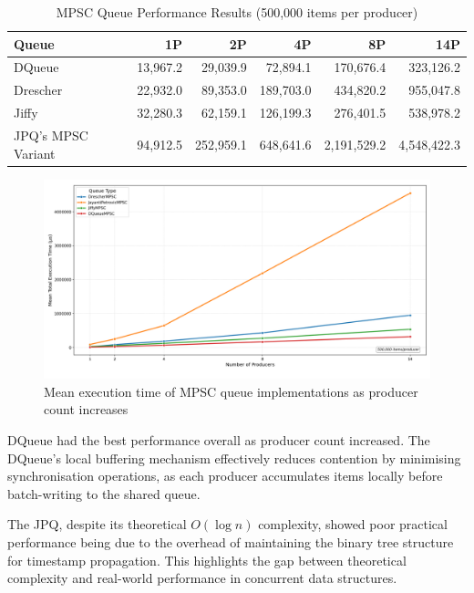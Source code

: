 \begin{table}[htb]
\centering
\caption{\ac{MPSC} Queue Performance Results (500,000 items per producer)}
\label{tab:mpsc-results}
\begin{tabular}{@{}lrrrrr@{}}
\toprule
Queue & 1P & 2P & 4P & 8P & 14P \\
\midrule
DQueue & 13,967.2 & 29,039.9 & 72,894.1 & 170,676.4 & 323,126.2 \\
Drescher & 22,932.0 & 89,353.0 & 189,703.0 & 434,820.2 & 955,047.8 \\
Jiffy & 32,280.3 & 62,159.1 & 126,199.3 & 276,401.5 & 538,978.2 \\
\ac{JPQ}'s \ac{MPSC} Variant & 94,912.5 & 252,959.1 & 648,641.6 & 2,191,529.2 & 4,548,422.3 \\
\bottomrule
\end{tabular}
\end{table}

\begin{figure}[htb]
\centering
\caption{Mean execution time of MPSC queue implementations as producer count increases}
\label{fig:mpsc-mean-performance}
\includegraphics[width=\textwidth]{images/results/mpsc_mean_performance_vs_producers.png}
\end{figure}

DQueue had the best performance overall as producer count increased. The DQueue's local buffering mechanism effectively reduces contention by minimising synchronisation operations, as each producer accumulates items locally before batch-writing to the shared queue.

The \ac{JPQ}, despite its theoretical $O(\log n)$ complexity, showed poor practical performance being due to the overhead of maintaining the binary tree structure for timestamp propagation. This highlights the gap between theoretical complexity and real-world performance in concurrent data structures.

